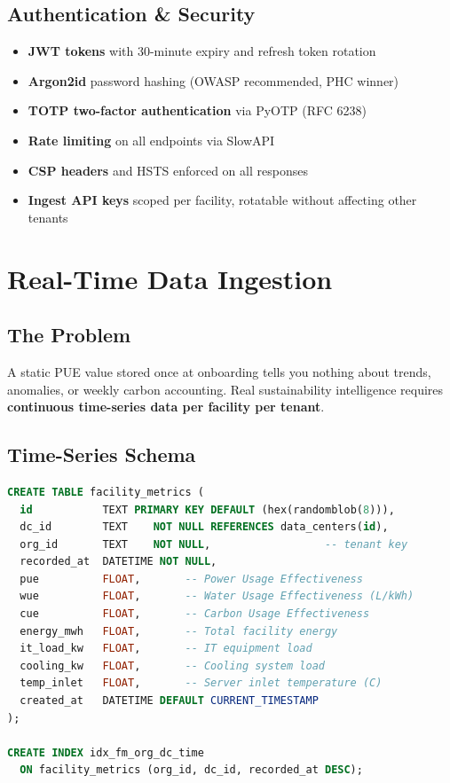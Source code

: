 \documentclass[11pt, a4paper]{article}
\begin{document}
\subsection{Authentication \& Security}

\begin{itemize}[leftmargin=1.4em]
  \item \textbf{JWT tokens} with 30-minute expiry and refresh token rotation
  \item \textbf{Argon2id} password hashing (OWASP recommended, PHC winner)
  \item \textbf{TOTP two-factor authentication} via PyOTP (RFC 6238)
  \item \textbf{Rate limiting} on all endpoints via SlowAPI
  \item \textbf{CSP headers} and HSTS enforced on all responses
  \item \textbf{Ingest API keys} scoped per facility, rotatable without affecting other tenants
\end{itemize}

\section{Real-Time Data Ingestion}

\subsection{The Problem}

A static PUE value stored once at onboarding tells you nothing about trends, anomalies, or weekly carbon accounting. Real sustainability intelligence requires \textbf{continuous time-series data per facility per tenant}.

\subsection{Time-Series Schema}

\begin{lstlisting}[language=SQL, caption=Facility metrics time-series table]
CREATE TABLE facility_metrics (
  id           TEXT PRIMARY KEY DEFAULT (hex(randomblob(8))),
  dc_id        TEXT    NOT NULL REFERENCES data_centers(id),
  org_id       TEXT    NOT NULL,                  -- tenant key
  recorded_at  DATETIME NOT NULL,
  pue          FLOAT,       -- Power Usage Effectiveness
  wue          FLOAT,       -- Water Usage Effectiveness (L/kWh)
  cue          FLOAT,       -- Carbon Usage Effectiveness
  energy_mwh   FLOAT,       -- Total facility energy
  it_load_kw   FLOAT,       -- IT equipment load
  cooling_kw   FLOAT,       -- Cooling system load
  temp_inlet   FLOAT,       -- Server inlet temperature (C)
  created_at   DATETIME DEFAULT CURRENT_TIMESTAMP
);

CREATE INDEX idx_fm_org_dc_time
  ON facility_metrics (org_id, dc_id, recorded_at DESC);
\end{lstlisting}
\end{document}
